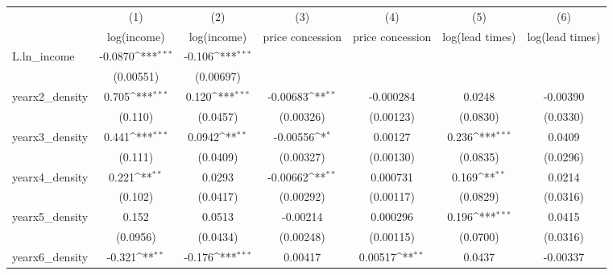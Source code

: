{
\def\sym#1{\ifmmode^{#1}\else\(^{#1}\)\fi}
\begin{tabular}{l*{6}{c}}
\toprule
            &\multicolumn{1}{c}{(1)}&\multicolumn{1}{c}{(2)}&\multicolumn{1}{c}{(3)}&\multicolumn{1}{c}{(4)}&\multicolumn{1}{c}{(5)}&\multicolumn{1}{c}{(6)}\\
            &\multicolumn{1}{c}{log(income)}&\multicolumn{1}{c}{log(income)}&\multicolumn{1}{c}{price concession}&\multicolumn{1}{c}{price concession}&\multicolumn{1}{c}{log(lead times)}&\multicolumn{1}{c}{log(lead times)}\\
\midrule
L.ln\_income &     -0.0870\sym{***}&      -0.106\sym{***}&                     &                     &                     &                     \\
            &   (0.00551)         &   (0.00697)         &                     &                     &                     &                     \\
\addlinespace
yearx2\_density&       0.705\sym{***}&       0.120\sym{***}&    -0.00683\sym{**} &   -0.000284         &      0.0248         &    -0.00390         \\
            &     (0.110)         &    (0.0457)         &   (0.00326)         &   (0.00123)         &    (0.0830)         &    (0.0330)         \\
\addlinespace
yearx3\_density&       0.441\sym{***}&      0.0942\sym{**} &    -0.00556\sym{*}  &     0.00127         &       0.236\sym{***}&      0.0409         \\
            &     (0.111)         &    (0.0409)         &   (0.00327)         &   (0.00130)         &    (0.0835)         &    (0.0296)         \\
\addlinespace
yearx4\_density&       0.221\sym{**} &      0.0293         &    -0.00662\sym{**} &    0.000731         &       0.169\sym{**} &      0.0214         \\
            &     (0.102)         &    (0.0417)         &   (0.00292)         &   (0.00117)         &    (0.0829)         &    (0.0316)         \\
\addlinespace
yearx5\_density&       0.152         &      0.0513         &    -0.00214         &    0.000296         &       0.196\sym{***}&      0.0415         \\
            &    (0.0956)         &    (0.0434)         &   (0.00248)         &   (0.00115)         &    (0.0700)         &    (0.0316)         \\
\addlinespace
yearx6\_density&      -0.321\sym{**} &      -0.176\sym{***}&     0.00417         &     0.00517\sym{**} &      0.0437         &    -0.00337         \\

\end{tabular}}
